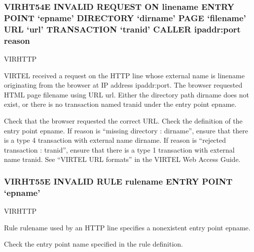 \documentclass[letterpaper,10pt,english]{sphinxmanual}
\begin{document}
\subsubsection{VIRHT54E INVALID REQUEST ON linename ENTRY POINT ‘epname’ DIRECTORY ‘dirname’ PAGE ‘filename’ URL ‘url’ TRANSACTION ‘tranid’ CALLER ipaddr:port reason}
\label{\detokenize{messages:virht54e-invalid-request-on-linename-entry-point-epname-directory-dirname-page-filename-url-url-transaction-tranid-caller-ipaddr-port-reason}}\begin{description}
\sphinxAtStartPar
VIRHTTP

\sphinxAtStartPar
VIRTEL received a request on the HTTP line whose external name is linename originating from the browser at IP address ipaddr:port. The browser requested HTML page filename using URL url. Either the directory path dirname does not exist, or there is no transaction named tranid under the entry point epname.

\sphinxAtStartPar
Check that the browser requested the correct URL. Check the definition of the entry point epname. If reason is “missing directory : dirname”, ensure that there is a type 4 transaction with external name dirname. If reason is “rejected transaction : tranid”, ensure that there is a type 1 transaction with external name tranid. See “VIRTEL URL formats” in the VIRTEL Web Access Guide.

\end{description}


\subsubsection{VIRHT55E INVALID RULE rulename ENTRY POINT ‘epname’}
\label{\detokenize{messages:virht55e-invalid-rule-rulename-entry-point-epname}}\begin{description}
\sphinxAtStartPar
VIRHTTP

\sphinxAtStartPar
Rule rulename used by an HTTP line specifies a non\sphinxhyphen{}existent entry point epname.

\sphinxAtStartPar
Check the entry point name specified in the rule definition.

\end{description}
\end{document}
